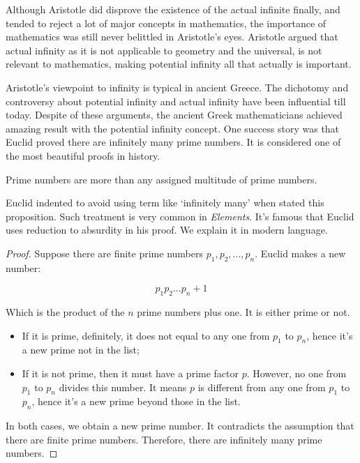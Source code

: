 \documentclass{article}
\begin{document}
Although Aristotle did disprove the existence of the actual infinite finally, and tended to reject a lot of major concepts in mathematics, the importance of mathematics was still never belittled in Aristotle’s eyes. Aristotle argued that actual infinity as it is not applicable to geometry and the universal, is not relevant to mathematics, making potential infinity all that actually is important.

Aristotle's viewpoint to infinity is typical in ancient Greece. The dichotomy and controversy about potential infinity and actual infinity have been influential till today. Despite of these arguments, the ancient Greek mathematicians achieved amazing result with the potential infinity concept. One success story was that Euclid proved there are infinitely many prime numbers. It is considered one of the most beautiful proofs in history.

\begin{proposition}
Prime numbers are more than any assigned multitude of prime numbers\cite{Elements}.
\end{proposition}

Euclid indented to avoid using term like `infinitely many' when stated this proposition. Such treatment is very common in {\em Elements}. It's famous that Euclid uses reduction to absurdity in his proof. We explain it in modern language.

\begin{proof}
Suppose there are finite prime numbers $p_1, p_2, ..., p_n$. Euclid makes a new number:

\[
p_1 p_2 ... p_n + 1
\]

Which is the product of the $n$ prime numbers plus one. It is either prime or not.

\begin{itemize}
\item If it is prime, definitely, it does not equal to any one from $p_1$ to $p_n$, hence it's a new prime not in the list;
\item If it is not prime, then it must have a prime factor $p$. However, no one from $p_1$ to $p_n$ divides this number. It means $p$ is different from any one from $p_1$ to $p_n$, hence it's a new prime beyond those in the list.
\end{itemize}

In both cases, we obtain a new prime number. It contradicts the assumption that there are finite prime numbers. Therefore, there are infinitely many prime numbers.
\end{proof}
\end{document}
